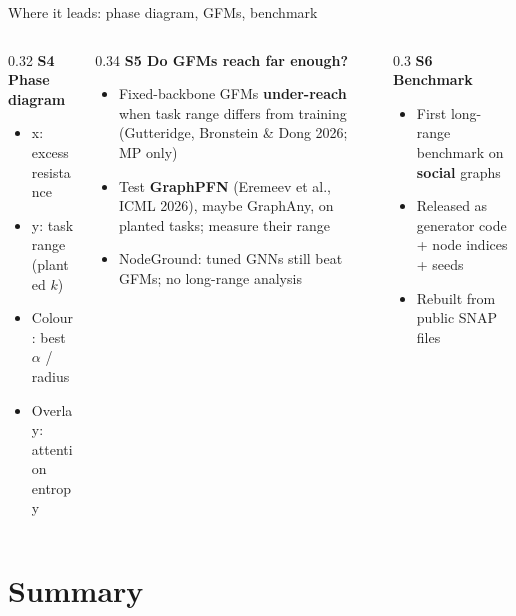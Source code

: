 \documentclass[aspectratio=169,10pt]{beamer}
\newcommand{\snote}[1]{{\scriptsize\textcolor{ink!70}{#1}}}
\begin{document}
\begin{frame}{Where it leads: phase diagram, GFMs, benchmark}
  \begin{columns}[T]
    \begin{column}{0.32\textwidth}
      \textbf{S4 Phase diagram}
      \begin{itemize}\small
        \item x: excess resistance
        \item y: task range (planted $k$)
        \item Colour: best $\alpha$ / radius
        \item Overlay: attention entropy
      \end{itemize}
    \end{column}
    \begin{column}{0.34\textwidth}
      \textbf{S5 Do GFMs reach far enough?}
      \begin{itemize}\small
        \item Fixed-backbone GFMs \textbf{under-reach} when task range differs from training \snote{(Gutteridge, Bronstein \& Dong 2026; MP only)}
        \item Test \textbf{GraphPFN} \snote{(Eremeev et al., ICML 2026)}, maybe GraphAny, on planted tasks; measure their range
        \item NodeGround: tuned GNNs still beat GFMs; no long-range analysis
      \end{itemize}
    \end{column}
    \begin{column}{0.3\textwidth}
      \textbf{S6 Benchmark}
      \begin{itemize}\small
        \item First long-range benchmark on \textbf{social} graphs
        \item Released as generator code + node indices + seeds
        \item Rebuilt from public SNAP files
      \end{itemize}
    \end{column}
  \end{columns}
\end{frame}

\section*{Summary}
\end{document}

